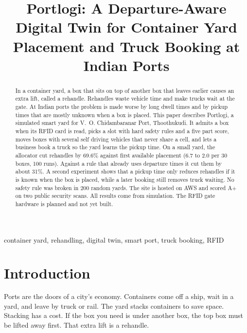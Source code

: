 \documentclass[conference]{IEEEtran}
\begin{document}
\title{Portlogi: A Departure-Aware Digital Twin for Container Yard Placement and Truck Booking at Indian Ports}

\author{
}

\maketitle

\begin{abstract}
In a container yard, a box that sits on top of another box that leaves earlier causes an extra lift, called a rehandle. Rehandles waste vehicle time and make trucks wait at the gate. At Indian ports the problem is made worse by long dwell times and by pickup times that are mostly unknown when a box is placed. This paper describes Portlogi, a simulated smart yard for V.~O. Chidambaranar Port, Thoothukudi. It admits a box when its RFID card is read, picks a slot with hard safety rules and a five part score, moves boxes with several self driving vehicles that never share a cell, and lets a business book a truck so the yard learns the pickup time. On a small yard, the allocator cut rehandles by 69.6\% against first available placement (6.7 to 2.0 per 30 boxes, 100 runs). Against a rule that already uses departure times it cut them by about 31\%. A second experiment shows that a pickup time only reduces rehandles if it is known when the box is placed, while a later booking still removes truck waiting. No safety rule was broken in 200 random yards. The site is hosted on AWS and scored A+ on two public security scans. All results come from simulation. The RFID gate hardware is planned and not yet built.
\end{abstract}

\begin{IEEEkeywords}
container yard, rehandling, digital twin, smart port, truck booking, RFID
\end{IEEEkeywords}

\section{Introduction}
Ports are the doors of a city's economy. Containers come off a ship, wait in a yard, and leave by truck or rail. The yard stacks containers to save space. Stacking has a cost. If the box you need is under another box, the top box must be lifted away first. That extra lift is a rehandle.
\end{document}
